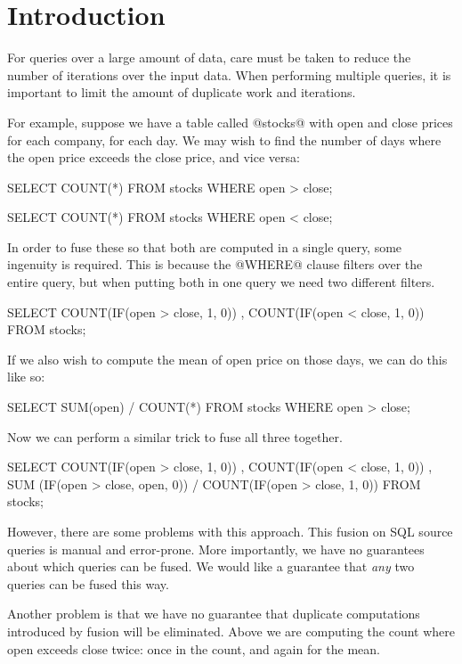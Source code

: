 \section{Introduction}
\label{s:Introduction}


For queries over a large amount of data, care must be taken to reduce the number of iterations over the input data.
When performing multiple queries, it is important to limit the amount of duplicate work and iterations.

For example, suppose we have a table called @stocks@ with open and close prices for each company, for each day.
We may wish to find the number of days where the open price exceeds the close price, and vice versa:
\begin{code}
SELECT COUNT(*)
FROM   stocks
WHERE  open > close;

SELECT COUNT(*)
FROM   stocks
WHERE  open < close;
\end{code}

In order to fuse these so that both are computed in a single query, some ingenuity is required.
This is because the @WHERE@ clause filters over the entire query, but when putting both in one query we need two different filters.
\begin{code}
SELECT COUNT(IF(open > close, 1, 0))
     , COUNT(IF(open < close, 1, 0))
FROM stocks;
\end{code}

If we also wish to compute the mean of open price on those days, we can do this like so:
\begin{code}
SELECT SUM(open) / COUNT(*)
FROM   stocks
WHERE  open > close;
\end{code}

Now we can perform a similar trick to fuse all three together.
\begin{code}
SELECT COUNT(IF(open > close, 1, 0))
     , COUNT(IF(open < close, 1, 0))
     , SUM  (IF(open > close, open, 0))
     / COUNT(IF(open > close, 1, 0))
FROM stocks;
\end{code}

However, there are some problems with this approach.
This fusion on SQL source queries is manual and error-prone.
More importantly, we have no guarantees about which queries can be fused.
We would like a guarantee that \emph{any} two queries can be fused this way.

Another problem is that we have no guarantee that duplicate computations introduced by fusion will be eliminated.
Above we are computing the count where open exceeds close twice: once in the count, and again for the mean.

